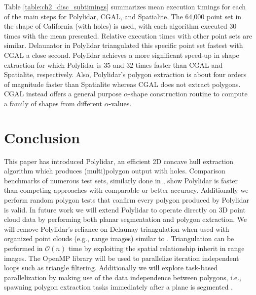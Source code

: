 Table \ref{table:ch2_disc_subtimings} summarizes mean execution timings for each of the main steps for Polylidar, CGAL, and Spatialite. The 64,000 point set in the shape of California (with holes) is used, with each algorithm executed 30 times with the mean presented.  Relative execution times with other point sets are similar.  Delaunator in Polylidar triangulated this specific point set fastest with CGAL a close second. Polylidar achieves a more significant speed-up in shape extraction for which Polylidar is 35 and 32 times faster than CGAL and Spatialite, respectively. Also, Polylidar's polygon extraction is about four orders of magnitude faster than Spatialite whereas CGAL does not extract polygons. CGAL instead offers a general purpose $\alpha$-shape construction routine to compute a family of shapes from different $\alpha$-values. %




\section{Conclusion}\label{sec:ch2_conclusion}

This paper has introduced Polylidar, an efficient 2D concave hull extraction algorithm which produces (multi)polygon output with holes. Comparison benchmarks of numerous test sets, similarly done in \cite{duckham_efficient_2008}, show Polylidar is faster than competing approaches with comparable or better accuracy. Additionally we perform random polygon tests that confirm every polygon produced by Polylidar is valid. In future work we will extend Polylidar to operate directly on 3D point cloud data by performing both planar segmentation and polygon extraction. We will remove Polylidar's reliance on Delaunay triangulation when used with organized point clouds (e.g., range images) similar to \cite{lee_fast_2013}. Triangulation can be performed in $\mathcal{O}(n)$ time by exploiting the spatial relationship inherit in range images. The OpenMP library will be used to parallelize iteration independent loops such as triangle filtering. Additionally we will explore task-based parallelization by making use of the data independence between polygons, i.e., spawning polygon extraction tasks immediately after a plane is segmented \cite{huang_cpp-taskflow_2019}. 